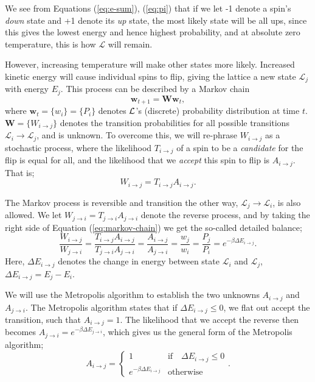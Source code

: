 \documentclass[]{article}
\begin{document}
We see from Equations (\ref{eq:e-sum}), (\ref{eq:pi}) that if we let -1 denote a spin's \textit{down} state and +1 denote its \textit{up} state, the most likely state will be all ups, since this gives the lowest energy and hence highest probability, and at absolute zero temperature, this is how $\mathcal{L}$ will remain. 

However, increasing temperature will make other states more likely. Increased kinetic energy will cause individual spins to flip, giving the lattice a new state $\mathcal{L}_j$ with energy $E_j$. This process can be described by a Markov chain
\begin{equation} \label{eq:markov-chain}
	\mathbf{w}_{t+1} = \mathbf{W} \mathbf{w}_{t},
\end{equation}
where $\mathbf{w}_t = \{w_i\} = \{P_i\}$ denotes $\cal{L}$'s (discrete) probability distribution at time $t$. $\mathbf{W} = \{W_{i \rightarrow j}\}$ denotes the transition probabilities for all possible transitions $\mathcal{L}_i \rightarrow \mathcal{L}_j$, and is unknown. To overcome this, we will re-phrase $W_{i \rightarrow j}$ as a stochastic process, where the likelihood $T_{i \rightarrow j}$ of a spin to be a \textit{candidate} for the flip is equal for all, and the likelihood that we \textit{accept} this spin to flip is $A_{i \rightarrow j}$. That is;
\begin{equation}
	W_{i \rightarrow j} = T_{i \rightarrow j} A_{i \rightarrow j}.
\end{equation}

The Markov process is reversible and transition the other way, $\mathcal{L}_j \rightarrow \mathcal{L}_i$, is also allowed. We let $W_{j \rightarrow i} = T_{j \rightarrow i} A_{j \rightarrow i}$ denote the reverse process, and by taking the right side of Equation (\ref{eq:markov-chain}) we get the so-called detailed balance;
\begin{equation}
	\frac{W_{i \rightarrow j}}{W_{j \rightarrow i}} 
	= \frac{T_{i \rightarrow j} A_{i \rightarrow j}}{T_{j \rightarrow i} A_{j \rightarrow i}} 
	= \frac{A_{i \rightarrow j}}{A_{j \rightarrow i}}
	= \frac{w_j}{w_i} = \frac{P_j}{P_i} = e^{-\beta \Delta E_{i \rightarrow j}}.
\end{equation}
Here, $\Delta E_{i \rightarrow j}$ denotes the change in energy between state $\mathcal{L}_i$ and $\mathcal{L}_j$, $\Delta E_{i \rightarrow j} = E_j - E_i$. 

We will use the Metropolis algorithm to establish the two unknowns $A_{i \rightarrow j}$ and $A_{j \rightarrow i}$. The Metropolis algorithm states that if $\Delta E_{i \rightarrow j} \le 0$, we flat out accept the transition, such that $A_{i \rightarrow j} = 1$. The likelihood that we accept the reverse then becomes $A_{j \rightarrow i} = e^{-\beta \Delta E_{j \rightarrow i}}$, which gives us the general form of the Metropolis algorithm;
\begin{equation} \label{eq:metropolis}
	A_{i \rightarrow j} = 
	\begin{cases}
	1 &\text{if} \quad \Delta E_{i \rightarrow j} \le 0 \\
	e^{-\beta \Delta E_{i \rightarrow j}} &\text{otherwise}
	\end{cases}.
\end{equation}
\end{document}
